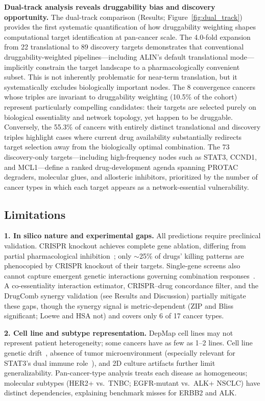 \documentclass[times, twoside, watermark]{zHenriquesLab-StyleBioRxiv}
\begin{document}
\textbf{Dual-track analysis reveals druggability bias and discovery opportunity.} The dual-track comparison (Results; Figure~\ref{fig:dual_track}) provides the first systematic quantification of how druggability weighting shapes computational target identification at pan-cancer scale. The 4.0-fold expansion from 22 translational to 89 discovery targets demonstrates that conventional druggability-weighted pipelines---including ALIN's default translational mode---implicitly constrain the target landscape to a pharmacologically convenient subset. This is not inherently problematic for near-term translation, but it systematically excludes biologically important nodes. The 8 convergence cancers whose triples are invariant to druggability weighting (10.5\% of the cohort) represent particularly compelling candidates: their targets are selected purely on biological essentiality and network topology, yet happen to be druggable. Conversely, the 55.3\% of cancers with entirely distinct translational and discovery triples highlight cases where current drug availability substantially redirects target selection away from the biologically optimal combination. The 73 discovery-only targets---including high-frequency nodes such as STAT3, CCND1, and MCL1---define a ranked drug-development agenda spanning PROTAC degraders, molecular glues, and allosteric inhibitors, prioritized by the number of cancer types in which each target appears as a network-essential vulnerability.

\subsection*{Limitations}

\textbf{1. In silico nature and experimental gaps.} All predictions require preclinical validation. CRISPR knockout achieves complete gene ablation, differing from partial pharmacological inhibition~\cite{Lin2017,Goncalves2020}; only $\sim$25\% of drugs' killing patterns are phenocopied by CRISPR knockout of their targets. Single-gene screens also cannot capture emergent genetic interactions governing combination responses~\cite{Norman2019,Shen2017combCRISPR}. A co-essentiality interaction estimator, CRISPR--drug concordance filter, and the DrugComb synergy validation (see Results and Discussion) partially mitigate these gaps, though the synergy signal is metric-dependent (ZIP and Bliss significant; Loewe and HSA not) and covers only 6 of 17 cancer types.

\textbf{2. Cell line and subtype representation.} DepMap cell lines may not represent patient heterogeneity; some cancers have as few as 1--2 lines. Cell line genetic drift~\cite{BenDavid2018}, absence of tumor microenvironment (especially relevant for STAT3's dual immune role~\cite{Yu2009STAT3immunity,Kortylewski2005}), and 2D culture artifacts further limit generalizability. Pan-cancer-type analysis treats each disease as homogeneous; molecular subtypes (HER2+ vs.\ TNBC; EGFR-mutant vs.\ ALK+ NSCLC) have distinct dependencies, explaining benchmark misses for ERBB2 and ALK.
\end{document}
